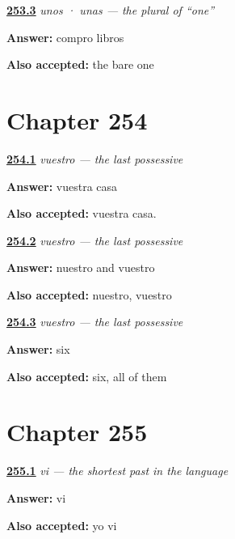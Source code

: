 \noindent\begin{minipage}[t]{\linewidth}
\raggedright
\hyperlink{review-ES-C65-unos-unas-bare}{\textbf{253.3}} \emph{unos · unas — the plural of \textquotedblleft{}one\textquotedblright{}}\par
\small \textbf{Answer:} compro libros\par
\footnotesize \textbf{Also accepted:} the bare one
\end{minipage}\par\medskip

\section*{Chapter 254}

\noindent\begin{minipage}[t]{\linewidth}
\raggedright
\hyperlink{review-ES-C65-vuestro-say}{\textbf{254.1}} \emph{vuestro — the last possessive}\par
\small \textbf{Answer:} vuestra casa\par
\footnotesize \textbf{Also accepted:} vuestra casa.
\end{minipage}\par\medskip

\noindent\begin{minipage}[t]{\linewidth}
\raggedright
\hyperlink{review-ES-C65-vuestro-which}{\textbf{254.2}} \emph{vuestro — the last possessive}\par
\small \textbf{Answer:} nuestro and vuestro\par
\footnotesize \textbf{Also accepted:} nuestro, vuestro
\end{minipage}\par\medskip

\noindent\begin{minipage}[t]{\linewidth}
\raggedright
\hyperlink{review-ES-C65-vuestro-count}{\textbf{254.3}} \emph{vuestro — the last possessive}\par
\small \textbf{Answer:} six\par
\footnotesize \textbf{Also accepted:} six, all of them
\end{minipage}\par\medskip

\section*{Chapter 255}

\noindent\begin{minipage}[t]{\linewidth}
\raggedright
\hyperlink{review-ES-C65-vi-di-saw}{\textbf{255.1}} \emph{vi — the shortest past in the language}\par
\small \textbf{Answer:} vi\par
\footnotesize \textbf{Also accepted:} yo vi
\end{minipage}\par\medskip

